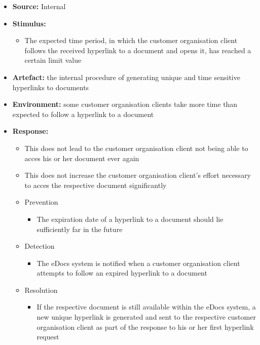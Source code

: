 \documentclass[a4paper,10pt]{article}
\begin{document}
\begin{itemize}
    \item \textbf{Source:} Internal
    \item \textbf{Stimulus:}
        \begin{itemize}
            \item The expected time period, in which the customer organisation client follows the received hyperlink to a document and opens it, has reached a certain limit value
        \end{itemize}

    \item \textbf{Artefact:} the internal procedure of generating unique and time sensitive hyperlinks to documents
    \item \textbf{Environment:} some customer organisation clients take more time than expected to follow a hyperlink to a document
    \item \textbf{Response:}
        \begin{itemize}
            \item This does not lead to the customer organisation client not being able to acces his or her document ever again
            \item This does not increase the customer organisation client's effort necessary to acces the respective document significantly
            \item Prevention
		\begin{itemize}
			\item The expiration date of a hyperlink to a document should lie sufficiently far in the future
		\end{itemize}
            \item Detection
		\begin{itemize}
			\item The eDocs system is notified when a customer organisation client attempts to follow an expired hyperlink to a document
		\end{itemize}
            \item Resolution
		\begin{itemize}
			\item If the respective document is still available within the eDocs system, a new unique hyperlink is generated and sent to the respective customer organisation client as part of the response to his or her first hyperlink request
		\end{itemize}
        \end{itemize}


\end{itemize}
\end{document}
